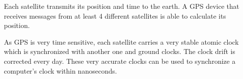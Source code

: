 Each satellite transmits its position and time to the earth. A GPS device that receives messages from at least 4 different satellites is able to calculate its position.

As GPS is very time sensitive, each satellite carries a very stable atomic clock which is synchronized with another one and ground clocks. The clock drift is corrected every day.
These very accurate clocks can be used to synchronize a computer’s clock within nanoseconds.

